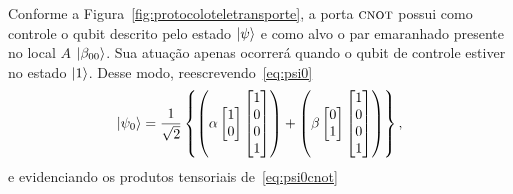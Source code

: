 Conforme a Figura~\ref{fig:protocoloteletransporte}, a porta \(\operatorname{\textsc{cnot}}\) possui como controle o qubit descrito pelo estado $\ket{\psi}$ e como alvo o par emaranhado presente no local \(A\) $\ket{\beta_{00}}$. Sua atuação apenas ocorrerá quando o qubit de controle estiver no estado $\ket{1}$. Desse modo, reescrevendo~\eqref{eq:psi0}
\begin{equation}\label{eq:psi0cnot}
\ket{\psi_0} = \frac{1}{\sqrt{2}}\left\{\left(\alpha \begin{bmatrix}
1 \\
0 
\end{bmatrix}  \begin{bmatrix}
1 \\
0 \\
0 \\
1
\end{bmatrix}\right) + \left(\beta \begin{bmatrix}
0 \\
1
\end{bmatrix}  \begin{bmatrix}
1 \\
0 \\
0 \\
1
\end{bmatrix}\right) \right\},
\end{equation}
e evidenciando os produtos tensoriais de~\eqref{eq:psi0cnot}
